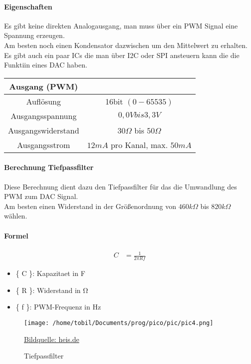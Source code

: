 \documentclass[a4paper,12pt,twoside]{article}
\begin{document}
\paragraph{Eigenschaften}
Es gibt keine direkten Analogausgang, man muss über ein PWM Signal eine Spannung erzeugen.\\
Am besten noch einen Kondensator dazwischen um den Mittelwert zu erhalten. \\
Es gibt auch ein paar ICs die man über I2C oder SPI ansteuern kann die die Funktiin eines DAC haben. \\
\begin{center}
	\begin{tabular}{|c|c|}
		\hline
		Ausgang (PWM)      &                               \\
		\hline
		\hline
		Auflösung          & 16bit $(0-65535)$             \\
		\hline
		Ausgangsspannung   & $0,0V bis 3,3V$               \\
		\hline
		Ausgangswiderstand & $30\Omega$ bis $50\Omega$     \\
		\hline
		Ausgangsstrom      & $12mA$ pro Kanal, max. $50mA$ \\
		\hline
	\end{tabular}
\end{center}
\paragraph{Berechnung Tiefpassfilter}
Diese Berechnung dient dazu den Tiefpassfilter für das die Umwandlung des PWM zum DAC Signal. \\
Am besten einen Widerstand in der Größenordnung von $460k\Omega$ bis $820k\Omega$ wählen. \\
\paragraph{Formel}
\begin{align}
	C & = \frac{1}{2 \pi R f}
\end{align}
\begin{itemize}
	\item \{ C \}: Kapazitaet in \si{\farad}
	\item \{ R \}: Widerstand in \si{\ohm}
	\item \{ f \}: PWM-Frequenz in \si{\hertz}
\end{itemize}
\begin{center}
	\begin{figure}[h]
		\centering
		\texttt{[image: /home/tobil/Documents/prog/pico/pic/pic4.png]}
		\caption{Tiefpassfilter}
		\small \href{https://www.heise.de/hintergrund/Gaengige-Verfahren-zur-Digital-Analog-Wandlung-6363918.html?seite=2}{Bildquelle: heis.de}
	\end{figure}
\end{center}
\end{document}
